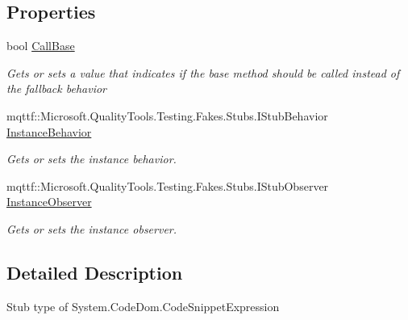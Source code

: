 \subsection*{Properties}
\begin{DoxyCompactItemize}
\item 
bool \hyperlink{class_system_1_1_code_dom_1_1_fakes_1_1_stub_code_snippet_expression_ac56b43dac258249e81fc3712f30ab9ed}{Call\-Base}
\begin{DoxyCompactList}\small\item\em Gets or sets a value that indicates if the base method should be called instead of the fallback behavior\end{DoxyCompactList}\item 
mqttf\-::\-Microsoft.\-Quality\-Tools.\-Testing.\-Fakes.\-Stubs.\-I\-Stub\-Behavior \hyperlink{class_system_1_1_code_dom_1_1_fakes_1_1_stub_code_snippet_expression_a97228e13d37e854afc3f0c2cc469460d}{Instance\-Behavior}
\begin{DoxyCompactList}\small\item\em Gets or sets the instance behavior.\end{DoxyCompactList}\item 
mqttf\-::\-Microsoft.\-Quality\-Tools.\-Testing.\-Fakes.\-Stubs.\-I\-Stub\-Observer \hyperlink{class_system_1_1_code_dom_1_1_fakes_1_1_stub_code_snippet_expression_a52214da07c14c09f24c4d4aac2253332}{Instance\-Observer}
\begin{DoxyCompactList}\small\item\em Gets or sets the instance observer.\end{DoxyCompactList}\end{DoxyCompactItemize}


\subsection{Detailed Description}
Stub type of System.\-Code\-Dom.\-Code\-Snippet\-Expression



